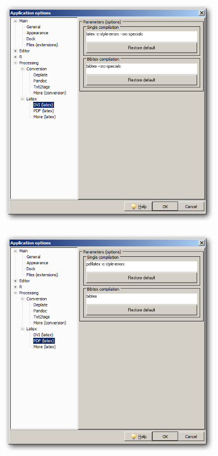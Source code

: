 \begin{figure}[h!]
  \includegraphics[scale=0.33]{./res/app_processing_latex_dvi.png}~~
  \includegraphics[scale=0.33]{./res/app_processing_latex_pdf.png}~~

\end{figure}
